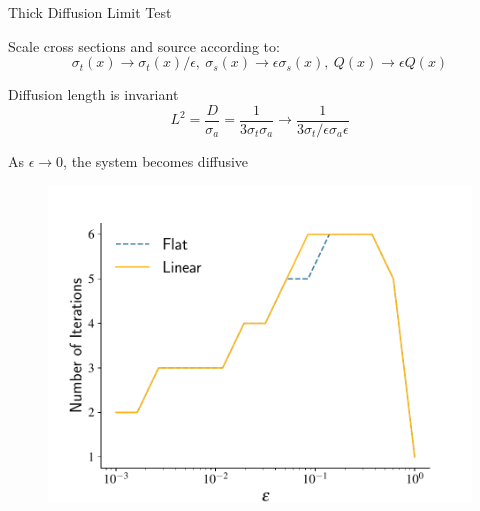 \documentclass[10pt]{beamer}
\begin{document}
\begin{frame}{Thick Diffusion Limit Test}

	Scale cross sections and source according to:
	\begin{equation*}
		\sigma_t(x) \rightarrow \sigma_t(x)/\epsilon, \
		\sigma_s(x) \rightarrow \epsilon \sigma_s(x), \
		Q(x) \rightarrow \epsilon Q(x)
	\end{equation*}

	Diffusion length is invariant 
	\begin{equation*}
		L^2 = \frac{D}{\sigma_a} = \frac{1}{3\sigma_t\sigma_a} \rightarrow
			\frac{1}{3 \sigma_t /\epsilon \sigma_a \epsilon}
	\end{equation*}

	As $\epsilon \rightarrow 0$, the system becomes diffusive 

	\vspace{-.2in}
	\begin{figure}[htb]
		\centering
		\includegraphics[height=.55\textheight]{figs/dl_it.pdf}
		\label{fig:dl_it}
	\end{figure}

\end{frame}
\end{document}
